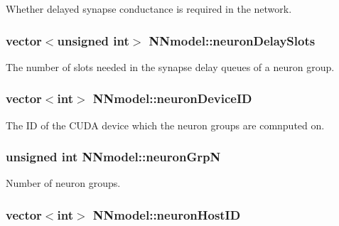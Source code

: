 Whether delayed synapse conductance is required in the network. 

\hypertarget{classNNmodel_a0801942c5e41585da01b2c341f1e9f55}{
\subsubsection[{neuron\+Delay\+Slots}]{\setlength{\rightskip}{0pt plus 5cm}vector$<$unsigned int$>$ N\+Nmodel\+::neuron\+Delay\+Slots}}\label{classNNmodel_a0801942c5e41585da01b2c341f1e9f55}


The number of slots needed in the synapse delay queues of a neuron group. 

\hypertarget{classNNmodel_a67ec0b349b4f423712b7636a3cc2fa1e}{
\subsubsection[{neuron\+Device\+I\+D}]{\setlength{\rightskip}{0pt plus 5cm}vector$<$int$>$ N\+Nmodel\+::neuron\+Device\+I\+D}}\label{classNNmodel_a67ec0b349b4f423712b7636a3cc2fa1e}


The I\+D of the C\+U\+D\+A device which the neuron groups are comnputed on. 

\hypertarget{classNNmodel_a383562e3f02192f58a6150a4ca0861c5}{
\subsubsection[{neuron\+Grp\+N}]{\setlength{\rightskip}{0pt plus 5cm}unsigned int N\+Nmodel\+::neuron\+Grp\+N}}\label{classNNmodel_a383562e3f02192f58a6150a4ca0861c5}


Number of neuron groups. 

\hypertarget{classNNmodel_a1ddf63324795faf42f32e4cf4a82a0e2}{
\subsubsection[{neuron\+Host\+I\+D}]{\setlength{\rightskip}{0pt plus 5cm}vector$<$int$>$ N\+Nmodel\+::neuron\+Host\+I\+D}}\label{classNNmodel_a1ddf63324795faf42f32e4cf4a82a0e2}


